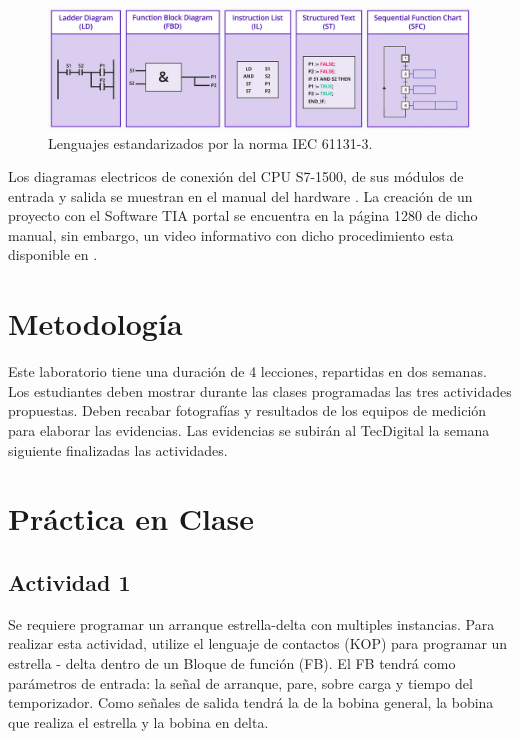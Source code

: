 \begin{figure}
	\centering
	\includegraphics[width=1\linewidth]{Imagenes/Languajes}
	\caption{Lenguajes estandarizados por la norma IEC 61131-3.}
	\label{fig:languajes}
\end{figure}


Los diagramas electricos de conexión del CPU S7-1500, de sus módulos de entrada y salida se muestran en el manual del hardware \cite{PLC-1500}. La creación de un proyecto con el Software TIA portal se encuentra en la página  1280 de dicho manual, sin embargo, un video informativo con dicho procedimiento esta disponible en \cite{Maria}. 



 
\section{Metodología}

Este laboratorio tiene una duración de 4 lecciones, repartidas en dos semanas. Los estudiantes deben mostrar durante las clases programadas las tres actividades propuestas. Deben recabar fotografías y resultados de los equipos de medición para elaborar las evidencias. Las evidencias se subirán al TecDigital la semana siguiente finalizadas las actividades.

\section{Práctica en Clase}

\subsection{Actividad 1}

	Se requiere programar un arranque estrella-delta con multiples instancias. Para realizar esta actividad, utilize el lenguaje de contactos (KOP) para programar un  estrella - delta  dentro de un Bloque de función (FB). El FB tendrá como parámetros de entrada: la señal de arranque, pare, sobre carga y tiempo del temporizador. Como señales de salida tendrá la de la bobina general, la bobina que realiza el estrella y la bobina en delta.
	
